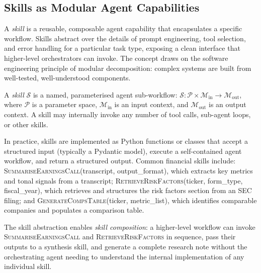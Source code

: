 \begin{deepdive}


\subsection{Skills as Modular Agent Capabilities}
\label{subsec:skills}

A \emph{skill} is a reusable, composable agent capability that encapsulates a specific
workflow. Skills abstract over the details of prompt engineering, tool selection, and
error handling for a particular task type, exposing a clean interface that higher-level
orchestrators can invoke. The concept draws on the software engineering principle of
modular decomposition: complex systems are built from well-tested, well-understood
components.

\begin{definition}[Skill]
\label{def:skill}
A \emph{skill} $\mathcal{S}$ is a named, parameterised agent sub-workflow:
$\mathcal{S}: \mathcal{P} \times \mathcal{M}_{\text{in}} \to \mathcal{M}_{\text{out}}$,
where $\mathcal{P}$ is a parameter space, $\mathcal{M}_{\text{in}}$ is an input
context, and $\mathcal{M}_{\text{out}}$ is an output context. A skill may internally
invoke any number of tool calls, sub-agent loops, or other skills.
\end{definition}

In practice, skills are implemented as Python functions or classes that accept a
structured input (typically a Pydantic model), execute a self-contained agent workflow,
and return a structured output. Common financial skills include:
\textsc{Summarise\-Earnings\-Call}(transcript, output\_format), which extracts key
metrics and tonal signals from a transcript;
\textsc{Retrieve\-Risk\-Factors}(ticker, form\_type, fiscal\_year), which retrieves
and structures the risk factors section from an SEC filing;
and \textsc{Generate\-Comps\-Table}(ticker, metric\_list), which identifies comparable
companies and populates a comparison table.

The skill abstraction enables \emph{skill composition}: a higher-level workflow can
invoke \textsc{Summarise\-Earnings\-Call} and \textsc{Retrieve\-Risk\-Factors} in
sequence, pass their outputs to a synthesis skill, and generate a complete research
note without the orchestrating agent needing to understand the internal implementation
of any individual skill.



\end{deepdive}
